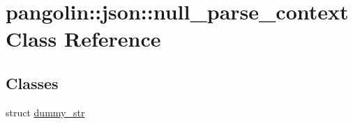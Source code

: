 \hypertarget{classpangolin_1_1json_1_1null__parse__context}{}\section{pangolin\+:\+:json\+:\+:null\+\_\+parse\+\_\+context Class Reference}
\label{classpangolin_1_1json_1_1null__parse__context}
\subsection*{Classes}
\begin{DoxyCompactItemize}
\item 
struct \hyperlink{structpangolin_1_1json_1_1null__parse__context_1_1dummy__str}{dummy\+\_\+str}
\end{DoxyCompactItemize}
